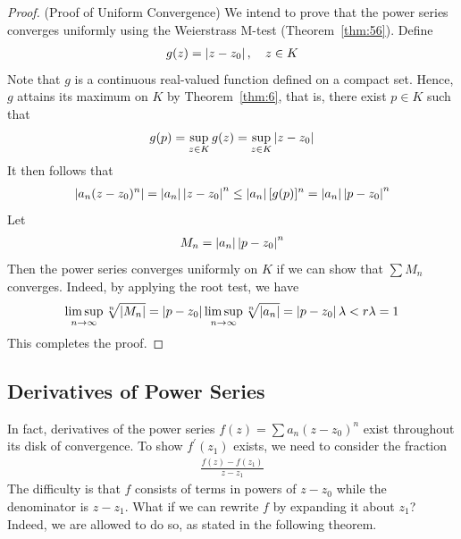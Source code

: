 \documentclass[thmcnt=section, 12pt]{my-elegantbook}
\begin{document}
\begin{proof}
    (Proof of Uniform Convergence) We intend to prove that the power series converges uniformly using the Weierstrass M-test (Theorem~\ref{thm:56}). Define
    \begin{align*}
        g(z) = \left\lvert z - z_0 \right\rvert,
        \quad z \in K
    \end{align*}
    Note that $g$ is a continuous real-valued function defined on a compact set. Hence, $g$ attains its maximum on $K$ by Theorem~\ref{thm:6}, that is, there exist $p \in K$ such that
    \begin{align*}
        g(p) = \sup_{z \in K} g(z)
        = \sup_{z \in K} \left\lvert z - z_0 \right\rvert
    \end{align*}
    It then follows that
    \begin{align*}
        \left\lvert a_n (z - z_0)^n \right\rvert
        = \left\lvert a_n \right\rvert \left\lvert z - z_0 \right\rvert^n
        \leq \left\lvert a_n \right\rvert [g(p)]^n
        = \left\lvert a_n \right\rvert \left\lvert p - z_0 \right\rvert^n
    \end{align*}
    Let
    \begin{align*}
        M_n = \left\lvert a_n \right\rvert \left\lvert p - z_0 \right\rvert^n
    \end{align*}
    Then the power series converges uniformly on $K$ if we can show that $\sum M_n$ converges. Indeed, by applying the root test, we have
    \begin{align*}
        \limsup_{n \to \infty} \sqrt[n]{\left\lvert M_n \right\rvert}
        = \left\lvert p - z_0 \right\rvert \limsup_{n \to \infty} \sqrt[n]{\left\lvert a_n \right\rvert}
        = \left\lvert p - z_0 \right\rvert \lambda
        < r \lambda
        = 1
    \end{align*}
    This completes the proof.
\end{proof}


\subsection{Derivatives of Power Series}

In fact, derivatives of the power series $f(z) = \sum a_n (z - z_0)^n$ exist throughout its disk of convergence. To show $f^\prime(z_1)$ exists, we need to consider the fraction
\begin{align*}
    \frac{f(z) - f(z_1)}{z - z_1}
\end{align*}
The difficulty is that $f$ consists of terms in powers of $z - z_0$ while the denominator is $z - z_1$. What if we can rewrite $f$ by expanding it about $z_1$? Indeed, we are allowed to do so, as stated in the following theorem.
\end{document}
